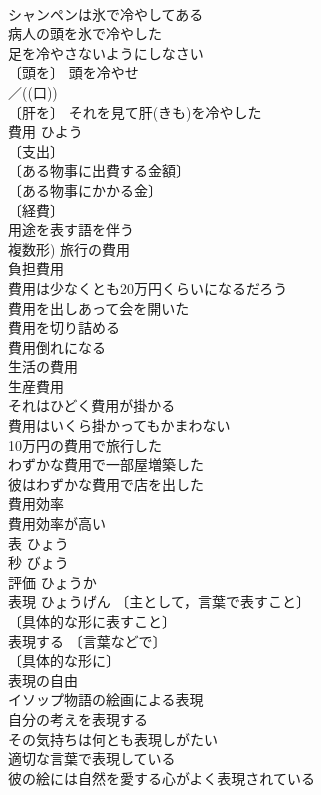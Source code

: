 \documentclass[8pt]{extreport}
\begin{document}
\begin{CJK}{UTF8}{min}
\\	シャンペンは氷で冷やしてある 
\\	病人の頭を氷で冷やした 
\\	足を冷やさないようにしなさい 
\\	〔頭を〕 頭を冷やせ 
\\	／((口)) 
\\	〔肝を〕 それを見て肝(きも)を冷やした 
\\	費用	ひよう	
\\	〔支出〕
\\	〔ある物事に出費する金額〕
\\	〔ある物事にかかる金〕
\\	〔経費〕
\\	用途を表す語を伴う
\\	複数形) 旅行の費用 
\\	負担費用 
\\	費用は少なくとも20万円くらいになるだろう 
\\	費用を出しあって会を開いた 
\\	費用を切り詰める 
\\	費用倒れになる 
\\	生活の費用 
\\	生産費用 
\\	それはひどく費用が掛かる 
\\	費用はいくら掛かってもかまわない 
\\	10万円の費用で旅行した 
\\	わずかな費用で一部屋増築した 
\\	彼はわずかな費用で店を出した 
\\	費用効率 
\\	費用効率が高い 
\\	表	ひょう	
\\	秒	びょう	
\\	評価	ひょうか	
\\	表現	ひょうげん	〔主として，言葉で表すこと〕
\\	〔具体的な形に表すこと〕
\\	表現する 〔言葉などで〕
\\	〔具体的な形に〕
\\	表現の自由 
\\	イソップ物語の絵画による表現 
\\	自分の考えを表現する 
\\	その気持ちは何とも表現しがたい 
\\	適切な言葉で表現している 
\\	彼の絵には自然を愛する心がよく表現されている 

\end{CJK}
\end{document}

